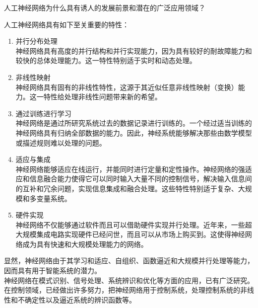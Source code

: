 \begin{question}
人工神经网络为什么具有诱人的发展前景和潜在的广泛应用领域？
\end{question}
\begin{solution}
人工神经网络具有如下至关重要的特性：
	\begin{enumerate}
		\item 并行分布处理 \\
神经网络具有高度的并行结构和并行实现能力，因为具有较好的耐故障能力和较快的总体处理能力。这一特性特别适于实时和动态处理。
		\item 非线性映射 \\
神经网络具有固有的非线性特性，这源于其近似任意非线性映射（变换）能力。这一特性给处理非线性问题带来新的希望。
		\item 通过训练进行学习 \\
神经网络是通过所研究系统过去的数据记录进行训练的。一个经过适当训练的神经网络具有归纳全部数据的能力。因此，神经系统能够解决那些由数学模型或描述规则难以处理的问题。
		\item 适应与集成 \\
神经网络能够适应在线运行，并能同时进行定量和定性操作。神经网络的强适应和信息融合能力使得它可以同时输入大量不同的控制信号，解决输入信息间的互补和冗余问题，实现信息集成和融合处理。这些特性特别适于复杂、大规模和多变量系统。
		\item 硬件实现 \\
神经网络不仅能够通过软件而且可以借助硬件实现并行处理。近年来，一些超大规模集成电路实现硬件已经问世，而且可以从市场上购买到。这使得神经网络成为具有快速和大规模处理能力的网络。
	\end{enumerate} \par
	显然，神经网络由于其学习和适应、自组织、函数逼近和大规模并行处理等能力，因而具有用于智能系统的潜力。\\
神经网络在模式识别、信号处理、系统辨识和优化等方面的应用，已有广泛研究。在控制领域，已经做出许多努力，把神经网络用于控制系统，处理控制系统的非线性和不确定性以及逼近系统的辨识函数等。
\end{solution}

